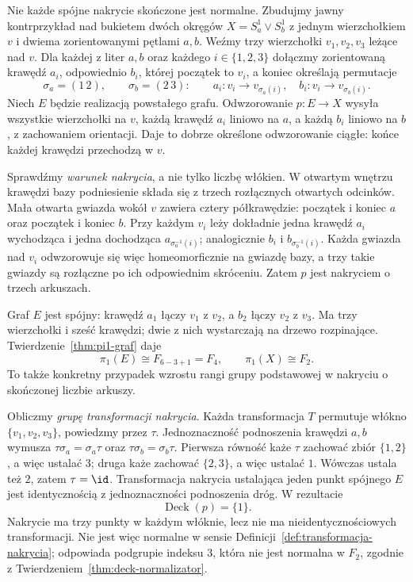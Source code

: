 \begin{przyklad}
\label{prz:nakrycie-nieregularne-bukiet-dg07}
Nie każde spójne nakrycie skończone jest normalne.
Zbudujmy jawny kontrprzykład nad bukietem dwóch okręgów
$X=S^1_a\vee S^1_b$ z jednym wierzchołkiem $v$
i dwiema zorientowanymi pętlami $a,b$.
Weźmy trzy wierzchołki $v_1,v_2,v_3$
leżące nad $v$. Dla każdej z liter $a,b$
oraz każdego $i\in\{1,2,3\}$ dołączmy
zorientowaną krawędź $a_i$, odpowiednio $b_i$,
której początek to $v_i$, a koniec określają permutacje
\[
 \sigma_a=(1\,2),\qquad \sigma_b=(2\,3):
 \qquad
 a_i:v_i\longrightarrow v_{\sigma_a(i)},\quad
 b_i:v_i\longrightarrow v_{\sigma_b(i)}.
\]
Niech $E$ będzie realizacją powstałego grafu.
Odwzorowanie $p:E\to X$ wysyła wszystkie wierzchołki
na $v$, każdą krawędź $a_i$ liniowo na $a$,
a każdą $b_i$ liniowo na $b$, z zachowaniem orientacji.
Daje to dobrze określone odwzorowanie ciągłe:
końce każdej krawędzi przechodzą w $v$.

Sprawdźmy \emph{warunek nakrycia}, a nie tylko liczbę włókien.
W otwartym wnętrzu krawędzi bazy podniesienie składa się
z trzech rozłącznych otwartych odcinków.
Mała otwarta gwiazda wokół $v$ zawiera cztery półkrawędzie:
początek i koniec $a$ oraz początek i koniec $b$.
Przy każdym $v_i$ leży dokładnie jedna krawędź
$a_i$ wychodząca i jedna dochodząca
$a_{\sigma_a^{-1}(i)}$; analogicznie
$b_i$ i $b_{\sigma_b^{-1}(i)}$.
Każda gwiazda nad $v_i$ odwzorowuje się więc
homeomorficznie na gwiazdę bazy,
a trzy takie gwiazdy są rozłączne po ich odpowiednim
skróceniu. Zatem $p$ jest nakryciem o trzech arkuszach.

Graf $E$ jest spójny: krawędź $a_1$ łączy $v_1$ z $v_2$,
a $b_2$ łączy $v_2$ z $v_3$.
Ma trzy wierzchołki i sześć krawędzi;
dwie z nich wystarczają na drzewo rozpinające.
Twierdzenie~\ref{thm:pi1-graf} daje
\[
 \pi_1(E)\cong F_{6-3+1}=F_4,\qquad
 \pi_1(X)\cong F_2.
\]
To także konkretny przypadek wzrostu rangi grupy
podstawowej w nakryciu o skończonej liczbie arkuszy.

Obliczmy \emph{grupę transformacji nakrycia}.
Każda transformacja $T$ permutuje włókno
$\{v_1,v_2,v_3\}$, powiedzmy przez $\tau$.
Jednoznaczność podnoszenia krawędzi $a,b$
wymusza
$\tau\sigma_a=\sigma_a\tau$ oraz
$\tau\sigma_b=\sigma_b\tau$.
Pierwsza równość każe $\tau$ zachować zbiór $\{1,2\}$,
a więc ustalać $3$; druga każe zachować $\{2,3\}$,
a więc ustalać $1$. Wówczas ustala też $2$,
zatem $\tau=\id$. Transformacja nakrycia
ustalająca jeden punkt spójnego $E$ jest identycznością
z jednoznaczności podnoszenia dróg.
W rezultacie
\[
 \operatorname{Deck}(p)=\{1\}.
\]
Nakrycie ma trzy punkty w każdym włóknie,
lecz nie ma nieidentycznościowych transformacji.
Nie jest więc normalne w sensie
Definicji~\ref{def:transformacja-nakrycia};
odpowiada podgrupie indeksu $3$, która nie jest normalna
w $F_2$, zgodnie z
Twierdzeniem~\ref{thm:deck-normalizator}.
\end{przyklad}


